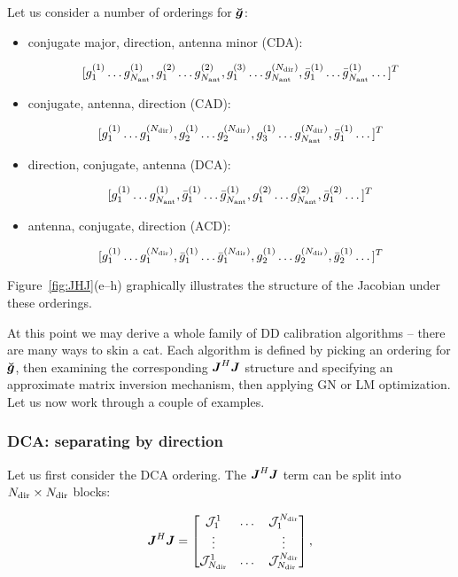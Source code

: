 \documentclass[useAMS,usenatbib]{mn2e}
\newcommand{\mat}[1]{{\bmath{#1}}}
\newcommand{\JJ}{\mat{J}} %
\newcommand{\JHJ}{\JJ^H\JJ} %
\begin{document}
Let us consider a number of orderings for $\Gg$:

\begin{itemize}
\item conjugate major, direction, antenna minor (CDA):

\[
[g^{(1)}_1 \dots g^{(1)}_{N_\mathrm{ant}}, g^{(2)}_1 \dots g^{(2)}_{N_\mathrm{ant}}, g^{(3)}_1 \dots g^{(N_\mathrm{dir})}_{N_\mathrm{ant}}, 
 \bar{g}^{(1)}_1 \dots \bar{g}^{(1)}_{N_\mathrm{ant}} \dots ]^T
\]

\item conjugate, antenna, direction (CAD):

\[
[g^{(1)}_1 \dots g^{(N_\mathrm{dir})}_1, g^{(1)}_2 \dots g^{(N_\mathrm{dir})}_2, g^{(1)}_3 \dots g^{(N_\mathrm{dir})}_{N_\mathrm{ant}}, 
 \bar{g}^{(1)}_1 \dots ]^T
\]

\item direction, conjugate, antenna (DCA):

\[
[g^{(1)}_1 \dots g^{(1)}_{N_\mathrm{ant}},\bar{g}^{(1)}_1 \dots \bar{g}^{(1)}_{N_\mathrm{ant}},
g^{(2)}_1 \dots g^{(2)}_{N_\mathrm{ant}}, \bar{g}^{(2)}_1 \dots ]^T
\]

\item antenna, conjugate, direction (ACD):

\[
[g^{(1)}_1 \dots g^{(N_\mathrm{dir})}_1,\bar{g}^{(1)}_1 \dots \bar{g}^{(N_\mathrm{dir})}_1,
g^{(1)}_2 \dots g^{(N_\mathrm{dir})}_2, \bar{g}^{(1)}_2 \dots ]^T
\]

\end{itemize}

Figure~\ref{fig:JHJ}(e--h) graphically illustrates the structure of the Jacobian under these orderings.

At this point we may derive a whole family of DD calibration algorithms -- there are many ways to skin a cat. Each 
algorithm is defined by picking an ordering for $\Gg$, then examining the corresponding $\JHJ$ structure and specifying 
an approximate matrix inversion mechanism, then applying GN or LM optimization. Let us now work through a couple of examples.

\subsubsection{DCA: separating by direction}

Let us first consider the DCA ordering. The $\JHJ$ term can be split into $N_\mathrm{dir}\times N_\mathrm{dir}$ blocks:

\newcommand{\JJJ}{\mathcal{J}}

\begin{equation}
\label{eq:JHJ:DD:blocked}
\JHJ = \Matrix{ccc}{\JJJ^1_1 & \dots & \JJJ^{\Nd}_1 \\
\vdots & & \vdots \\
\JJJ_{\Nd}^1 & \dots & \JJJ_{\Nd}^{\Nd} },
\end{equation}
\end{document}

